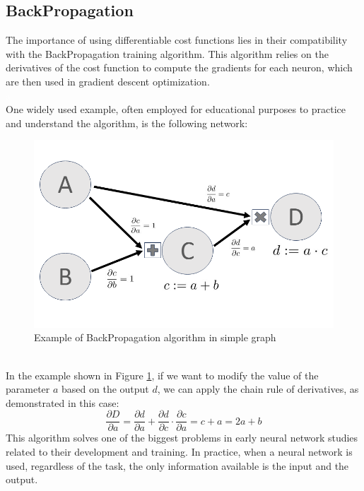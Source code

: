 \documentclass[a4paper, 11pt]{article}
\begin{document}
\newpage
\subsection{BackPropagation}
The importance of using differentiable cost functions lies in their compatibility with the BackPropagation training algorithm. This algorithm relies on the derivatives of the cost function to compute the gradients for each neuron, which are then used in gradient descent optimization.\\
\textcolor{white}{a}\\
One widely used example, often employed for educational purposes to practice and understand the algorithm, is the following network:
\vspace{-1em}
\begin{figure}[h!]
    \centering
    \includegraphics[width = 1 \textwidth]{Neural_Network/back-graph.png}
    \vspace{-3em}
    \caption{Example of BackPropagation algorithm in simple graph}
    \label{back-prop-example}
\end{figure}\\
In the example shown in Figure \ref{back-prop-example}, if we want to modify the value of the parameter $a$ based on the output $d$, we can apply the chain rule of derivatives, as demonstrated in this case:
\begin{equation*}
    \frac{\partial D}{\partial a} = \frac{\partial d}{\partial a} + \frac{\partial d}{\partial c} \cdot \frac{\partial c}{\partial a} = c + a = 2a+b
\end{equation*}
This algorithm solves one of the biggest problems in early neural network studies related to their development and training. In practice, when a neural network is used, regardless of the task, the only information available is the input and the output.\\
\end{document}
